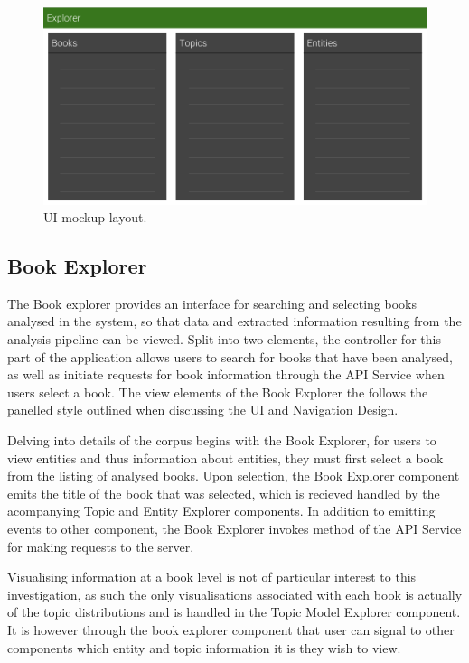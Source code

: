 \documentclass[10pt]{report}
\begin{document}
\begin{figure}[h!]
\includegraphics[scale=0.4]{ui_layout_drawing}
\caption{UI mockup layout. \label{fig:ui_layout_sketchup}}
\end{figure}

\subsection{Book Explorer}
The Book explorer provides an interface for searching and selecting books analysed in the system, so that data and extracted information resulting from the analysis pipeline can be viewed. Split into two elements, the controller for this part of the application allows users to search for books that have been analysed, as well as initiate requests for book information through the API Service when users select a book. The view elements of the Book Explorer the follows the panelled style outlined when discussing the UI and Navigation Design.

Delving into details of the corpus begins with the Book Explorer, for users to view entities and thus information about entities, they must first select a book from the listing of analysed books. Upon selection, the Book Explorer component emits the title of the book that was selected, which is recieved handled by the acompanying Topic and Entity Explorer components. In addition to emitting events to other component, the Book Explorer invokes method of the API Service for making requests to the server.

Visualising information at a book level is not of particular interest to this investigation, as such the only visualisations associated with each book is actually of the topic distributions and is handled in the Topic Model Explorer component. It is however through the book explorer component that user can signal to other components which entity and topic information it is they wish to view.
\end{document}
